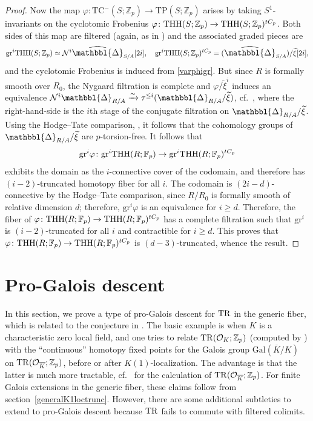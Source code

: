 \documentclass{amsart}
\newcommand{\Prism}{{\mathlarger{\mathbbl{\Delta}}}}
\newcommand{\Prismh}{\widehat{\Prism}}
\newcommand{\gr}{\mathrm{gr}}
\theoremstyle{definition}
\newcommand{\TC}{\mathrm{TC}}
\newcommand{\TP}{\mathrm{TP}}
\begin{document}
\begin{proof}
Now the map $\varphi \colon \TC^-(S; \mathbb{Z}_p) \to \TP(S;
\mathbb{Z}_p)$ arises
by taking $S^1$-invariants on the cyclotomic Frobenius $\varphi \colon \mathrm{THH}(S; \mathbb{Z}_p) \to
\mathrm{THH}(S; \mathbb{Z}_p)^{tC_p}$. Both sides of this map are filtered (again, as
in \cite{BMS2}) and the
associated graded pieces are 
\[ \gr^i \THH(S; \mathbb{Z}_p) \simeq \mathcal{N}^{i} \Prismh_{S/A}[2i], \quad \gr^i
\THH(S; \mathbb{Z}_p)^{tC_p} = (\Prismh_{S/A})/\widetilde{\xi} [2i],\]
and the cyclotomic Frobenius
is induced from \eqref{varphigr}. 
But since $R$ is formally smooth over $R_0$, the Nygaard filtration is complete  and 
$\varphi/\widetilde{\xi}^i$ induces an equivalence
$\mathcal{N}^i \Prism_{R/A} \xrightarrow{\sim} \tau^{\leq i} ( \Prism_{R/A}/
\widetilde{\xi})$, cf.~\cite[Sec.~12.4]{Prisms}, where the right-hand-side is the $i$th stage
of the conjugate filtration on $\Prism_{R/A}/\widetilde{\xi}$. 
Using the Hodge--Tate comparison, \cite[Th.~4.10]{Prisms}, it follows that 
the cohomology groups of $\Prism_{R/A}/\widetilde{\xi}$ are $p$-torsion-free. 
It follows that 
$$ \gr^i \varphi \colon  \gr^i \THH(R; \mathbb{F}_p) \to  \gr^i \THH(R;
\mathbb{F}_p)^{tC_p}$$
exhibits the domain as the $i$-connective cover of the codomain, and therefore
has $(i -2)$-truncated homotopy fiber for all $i$. The codomain is
$(2i-d)$-connective 
by the Hodge--Tate comparison, since $R/R_0$ is formally smooth of
relative dimension $d$; therefore, $\gr^i \varphi$ is an equivalence for $i \geq
d$.
Therefore, the fiber of $\varphi \colon \mathrm{THH}(R; \mathbb{F}_p) \to \mathrm{THH}(R;
\mathbb{F}_p)^{tC_p}$  
has a complete filtration such that $\gr^i $ is $(i-2)$-truncated for all $i$
and contractible for $i \geq d$. This proves that 
$\varphi \colon \mathrm{THH}(R; \mathbb{F}_p) \to \mathrm{THH}(R;
\mathbb{F}_p)^{tC_p}$
is $(d-3)$-truncated, whence the result. 
\end{proof} 


\section{Pro-Galois descent}

In this section, we prove a type of pro-Galois descent for $\mathrm{TR}$ in the generic
fiber, which is related to the conjecture in \cite{HesICM}. The basic example is when $K$ is a characteristic zero local field, 
and one tries to relate $\mathrm{TR}(\mathcal{O}_K; \mathbb{Z}_p)$ (computed by \cite{HM03}) with the ``continuous'' homotopy fixed points
for the Galois group $\mathrm{Gal}(\overline{K}/K)$ on $\mathrm{TR}(
\mathcal{O}_{\overline{K}}; \mathbb{Z}_p)$, before or after $K(1)$-localization. 
The advantage is that the latter is much more tractable, 
cf.~\cite{Hes06} for the calculation of $\mathrm{TR}( \mathcal{O}_{\overline{K}};
\mathbb{Z}_p)$. 
For finite Galois extensions in the generic fiber, these claims follow from
section~\ref{generalK1loctrunc}. However, there are some additional subtleties
to extend to pro-Galois descent because $\mathrm{TR}$ fails to commute with filtered
colimits. 
\end{document}
